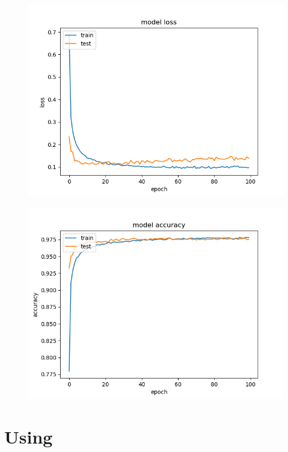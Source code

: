 \documentclass[12pt]{article}
\begin{document}
\begin{figure}[H]{}
    \centering
    \includegraphics[scale=0.8]{../mnist_models/MLPNN_type1-batch128-balanced/0test_loss_acc.png}
    \label{fig:cc}
\end{figure}

\begin{figure}[H]{}
    \centering
    \includegraphics[scale=0.8]{../mnist_models/MLPNN_type1-batch128-balanced/0train_loss_acc.png}
    \label{fig:cc}
\end{figure}


\section{Using}
\end{document}
